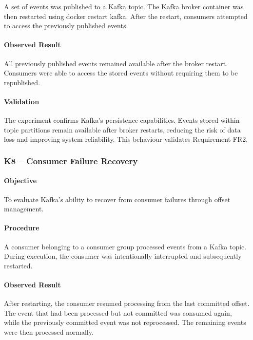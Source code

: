 \documentclass{scrartcl}
\begin{document}
A set of events was published to a Kafka topic. The Kafka broker container was then restarted using docker restart kafka. After the restart, consumers attempted to access the previously published events.
\paragraph{Observed Result}

All previously published events remained available after the broker restart. Consumers were able to access the stored events without requiring them to be republished.

\paragraph{Validation}

The experiment confirms Kafka's persistence capabilities. Events stored within topic partitions remain available after broker restarts, reducing the risk of data loss and improving system reliability. This behaviour validates Requirement FR2.

\subsubsection{K8 -- Consumer Failure Recovery}

\paragraph{Objective}

To evaluate Kafka’s ability to recover from consumer failures through offset management.

\paragraph{Procedure}

A consumer belonging to a consumer group processed events from a Kafka topic. During execution, the consumer was intentionally interrupted and subsequently restarted.

\paragraph{Observed Result}

After restarting, the consumer resumed processing from the last committed offset. The event that had been processed but not committed was consumed again, while the previously committed event was not reprocessed. The remaining events were then processed normally.
\end{document}
